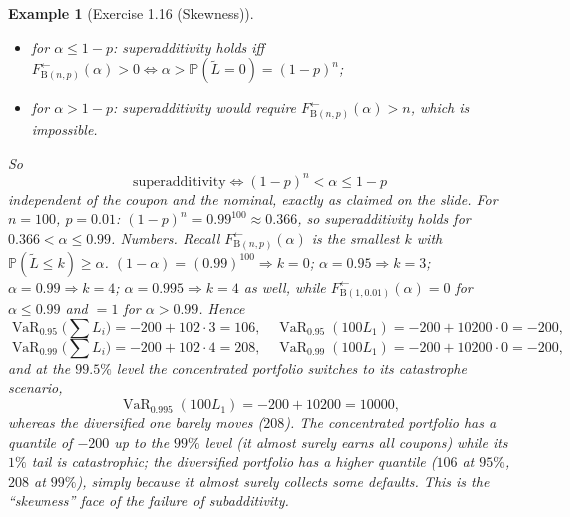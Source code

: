 \documentclass[11pt,a4paper]{article}
\newtheorem{example}{Example}
\newcommand{\VaR}{\operatorname{VaR}}
\renewcommand{\P}{\mathbb{P}}
\begin{document}
\begin{example}[Exercise 1.16 (Skewness)]
\begin{itemize}[nosep]
  \item for $\alpha\le1-p$: superadditivity holds iff
        $F^{\leftarrow}_{\text{B}(n,p)}(\alpha)>0\iff\alpha>\P(\tilde L=0)=(1-p)^n$;
  \item for $\alpha>1-p$: superadditivity would require
        $F^{\leftarrow}_{\text{B}(n,p)}(\alpha)>n$, which is impossible.
\end{itemize}
So
\[
  \boxed{\ \text{superadditivity}\iff (1-p)^n<\alpha\le1-p\ }
\]
independent of the coupon and the nominal, exactly as claimed on the slide. For $n=100$, $p=0.01$:
$(1-p)^n=0.99^{100}\approx0.366$, so superadditivity holds for $0.366<\alpha\le0.99$. \emph{Numbers.}
Recall $F^{\leftarrow}_{\text{B}(n,p)}(\alpha)$ is the smallest $k$ with $\P(\tilde L\le k)\ge\alpha$.
$(1-\alpha)=(0.99)^{100}\Rightarrow k=0$; $\alpha=0.95\Rightarrow k=3$; $\alpha=0.99\Rightarrow k=4$;
$\alpha=0.995\Rightarrow k=4$ as well, while $F^{\leftarrow}_{\text{B}(1,0.01)}(\alpha)=0$ for
$\alpha\le0.99$ and $=1$ for $\alpha>0.99$. Hence
\[
  \VaR_{0.95}\Big(\sum L_i\Big)=-200+102\cdot3=106,\quad
  \VaR_{0.95}(100L_1)=-200+10200\cdot0=-200,
\]
\[
  \VaR_{0.99}\Big(\sum L_i\Big)=-200+102\cdot4=208,\quad
  \VaR_{0.99}(100L_1)=-200+10200\cdot0=-200,
\]
and at the $99.5\%$ level the concentrated portfolio switches to its catastrophe scenario,
\[
  \VaR_{0.995}(100L_1)=-200+10200=10000,
\]
whereas the diversified one barely moves ($208$). The
concentrated portfolio has a quantile of $-200$ up to the $99\%$ level (it almost surely earns all
coupons) while its $1\%$ tail is catastrophic; the diversified portfolio has a \emph{higher}
quantile ($106$ at $95\%$, $208$ at $99\%$), simply because it almost surely collects some defaults.
This is the ``skewness'' face of the failure of subadditivity.
\end{example}
\end{document}
